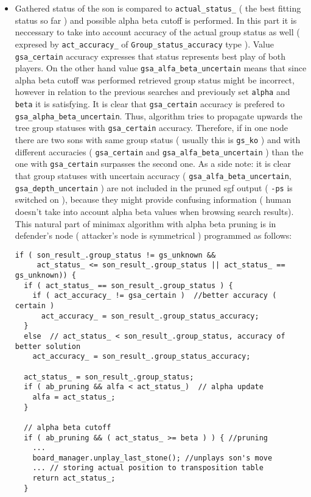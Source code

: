 \label{page_3_node_comparing}
\begin{itemize}
\item Gathered status of the son is compared to {\tt actual\_\-status\_\-} ( the best fitting status so far ) and possible alpha beta cutoff is performed. In this part it is neccessary to take into account accuracy of the actual group status as well ( expresed by {\tt act\_\-accuracy\_\-} of {\tt Group\_\-status\_\-accuracy} type ). Value {\tt gsa\_\-certain} accuracy expresses that status represents best play of both players. On the other hand value {\tt gsa\_\-alfa\_\-beta\_\-uncertain} means that since alpha beta cutoff was performed retrieved group status might be incorrect, however in relation to the previous searches and previously set {\tt alpha} and {\tt beta} it is satisfying. It is clear that {\tt gsa\_\-certain} accuracy is prefered to {\tt gsa\_\-alpha\_\-beta\_\-uncertain}. Thus, algorithm tries to propagate upwards the tree group statuses with {\tt gsa\_\-certain} accuracy. Therefore, if in one node there are two sons with same group status ( usually this is {\tt gs\_\-ko} ) and with different accuracies ( {\tt gsa\_\-certain} and {\tt gsa\_\-alfa\_\-beta\_\-uncertain} ) than the one with {\tt gsa\_\-certain} surpasses the second one. As a side note: it is clear that group statuses with uncertain accuracy ( {\tt gsa\_\-alfa\_\-beta\_\-uncertain}, {\tt gsa\_\-depth\_\-uncertain} ) are not included in the pruned sgf output ( {\tt -ps} is switched on ), because they might provide confusing information ( human doesn't take into account alpha beta values when browsing search results). This natural part of minimax algorithm with alpha beta pruning is in defender's node ( attacker's node is symmetrical ) programmed as follows: 

\footnotesize\begin{verbatim}if ( son_result_.group_status != gs_unknown && 
     act_status_ <= son_result_.group_status || act_status_ == gs_unknown)) {
  if ( act_status_ == son_result_.group_status ) {
    if ( act_accuracy_ != gsa_certain )  //better accuracy ( certain )
      act_accuracy_ = son_result_.group_status_accuracy; 
  }
  else  // act_status_ < son_result_.group_status, accuracy of better solution
    act_accuracy_ = son_result_.group_status_accuracy; 

  act_status_ = son_result_.group_status; 
  if ( ab_pruning && alfa < act_status_)  // alpha update 
    alfa = act_status_;
  }

  // alpha beta cutoff
  if ( ab_pruning && ( act_status_ >= beta ) ) { //pruning
    ...
    board_manager.unplay_last_stone(); //unplays son's move 
    ... // storing actual position to transposition table  
    return act_status_;
  }
\end{verbatim}
\normalsize
\end{itemize}


